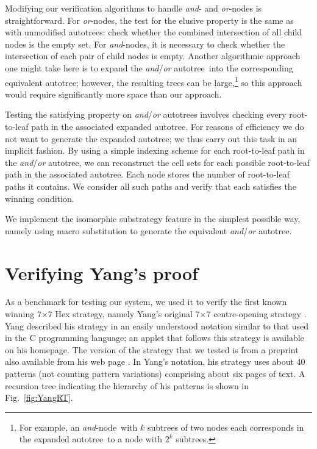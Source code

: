 \documentclass{llncs}
\def\at{autotree}
\def\aoat{{\it and}/{\it or} autotree}
\def\myAND{\mbox{\it and}}
\def\myOR{\mbox{\it or}}
\def\andnode{\myAND-node}
\def\ornode{\myOR-node}
\newcommand{\board}[2]{\mbox{$#1$$\times$$#2$}}
\begin{document}
Modifying our verification algorithms to
handle \myAND- and \ornode s is straightforward.
For \myOR-nodes, the test for the elusive property
is the same as with unmodified \at s:
check whether the combined intersection 
of all child nodes is the empty set.
For \andnode s, it is necessary to check 
whether the intersection of each
pair of child nodes is empty.
Another algorithmic approach one might take
here is to expand the \aoat\
into the corresponding equivalent \at;
however, the resulting trees can be large,\footnote{For example,
  an \andnode\ with $k$ subtrees of two nodes each
  corresponds in the expanded \at\ to a node
  with $2^k$ subtrees.}
so this approach would require significantly more space than our approach.

Testing the satisfying property on \aoat s
involves checking every root-to-leaf path
in the associated expanded \at.
For reasons of efficiency we do not want
to generate the expanded \at;
we thus carry out this task in an implicit fashion.
By using a simple indexing scheme for each root-to-leaf path
in the \aoat, we can reconstruct the cell sets
for each possible root-to-leaf path in the associated \at.
Each node stores the number of root-to-leaf paths it contains.
We consider all such paths and verify that each
satisfies the winning condition.

We implement the isomorphic substrategy feature
in the simplest possible way, namely
using macro substitution to generate
the equivalent \aoat.



\section{Verifying Yang's proof}
As a benchmark for testing our system,
we used it to verify the first known winning \board{7}{7} Hex strategy,
namely Yang's original \board{7}{7} 
centre-opening strategy \cite{Yang01web,Yang01}.
Yang described his strategy in an easily understood notation
similar to that used in the C programming language;
an applet that follows this strategy is available on his homepage\cite{Yang03}.
The version of the strategy that we tested
is from a preprint also available from his web page \cite{Yang01web}.
In Yang's notation, his strategy uses about 40 patterns 
(not counting pattern variations) comprising about six pages of text.
A recursion tree indicating the hierarchy of his patterns
is shown in Fig.~\ref{fig:YangRT}.


\end{document}
